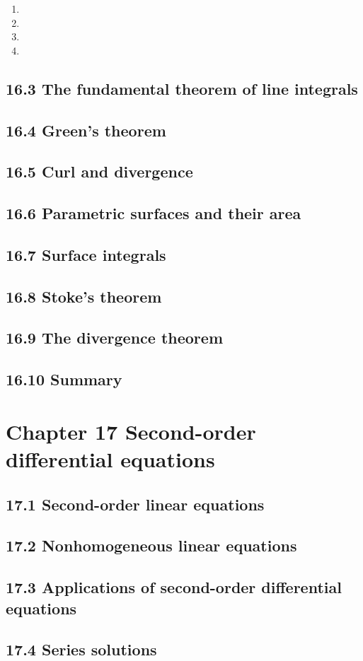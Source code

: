 \documentclass{article}
\begin{document}
\begin{enumerate}

\item 

\item 

\item 

\item 

\end{enumerate}

\subsection{16.3 The fundamental theorem of line integrals}
\subsection{16.4 Green's theorem}
\subsection{16.5 Curl and divergence}
\subsection{16.6 Parametric surfaces and their area}
\subsection{16.7 Surface integrals}
\subsection{16.8 Stoke's theorem}
\subsection{16.9 The divergence theorem}
\subsection{16.10 Summary}

\section{Chapter 17 Second-order differential equations}
\subsection{17.1 Second-order linear equations}
\subsection{17.2 Nonhomogeneous linear equations}
\subsection{17.3 Applications of second-order differential equations}
\subsection{17.4 Series solutions}
\end{document}
